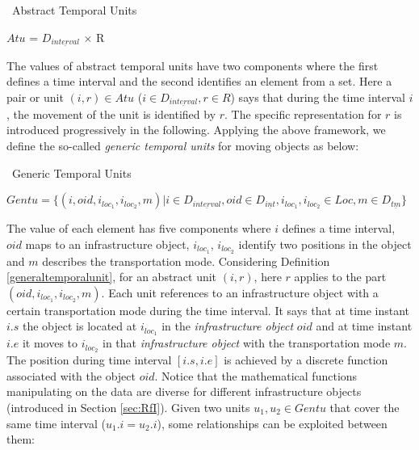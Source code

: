 \begin{Statement}
\label{generaltemporalunit}
\ Abstract Temporal Units 

$Atu$ = $D_{\underline{interval}}$ $\times$ R
\end{Statement} 

The values of abstract temporal units 
have two components where the first defines a time interval and the 
second identifies an element from a set. Here a pair or unit $(i,r) \in Atu$ 
($i \in D_{\underline{interval}}, r \in R$) says that during the time interval $i$, the movement of 
the unit is identified by $r$. The specific representation for $r$ is introduced 
progressively in the following. Applying the above framework, we define the so-called 
\textit{generic temporal units} for moving objects as below: 

\begin{Statement}
\label{generictemporalunit}
\ Generic Temporal Units

$Gentu=\{(i,oid,i_{loc_1},i_{loc_2}, m)|i \in D_{\underline{interval}},
oid \in D_{\underline{int}}, i_{loc_1},i_{loc_2} \in Loc, m \in D_{\underline{tm}}\}$
\end{Statement}

The value of each element has five components where $i$ defines a time interval, 
$oid$ maps to an infrastructure object, $i_{loc_1}$, $i_{loc_2}$ identify two positions in the object 
and $m$ describes the transportation mode. Considering Definition \ref{generaltemporalunit}, 
for an abstract unit $(i,r)$, here $r$ applies to the part $(oid,i_{loc_1},i_{loc_2},m)$. 
Each unit references to an infrastructure object with a certain transportation mode during the 
time interval. It says that at time instant $i.s$ the object is located at $i_{loc_1}$ in the \textit{infrastructure object} $oid$ and at time instant $i.e$ it moves to $i_{loc_2}$ in that \textit{infrastructure object} with the transportation mode $m$. The position during time
interval $[i.s,i.e]$ is achieved by a discrete function associated with the object $oid$. 
Notice that the mathematical functions manipulating on the data are diverse for different infrastructure objects (introduced in Section \ref{sec:RfI}). Given two units $u_1, u_2 \in Gentu$ that cover the same time interval ($u_1.i=u_2.i$), some relationships can be exploited between them: 

